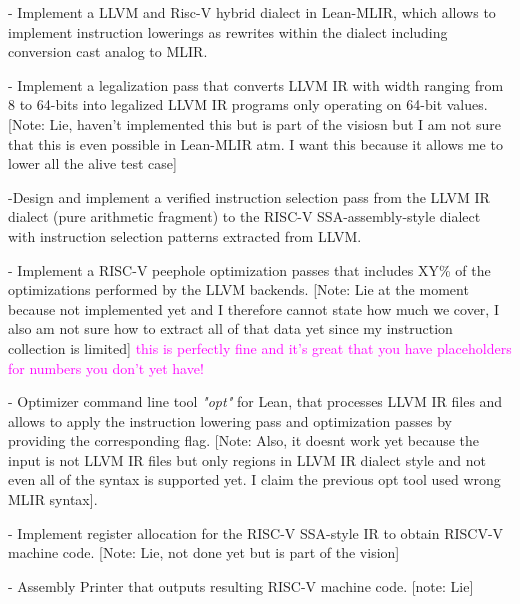 - Implement a LLVM and Risc-V hybrid dialect in Lean-MLIR, which allows to implement instruction lowerings as 
  rewrites within the dialect including conversion cast analog to MLIR.

- Implement a legalization pass that converts LLVM IR with width ranging from 8 to 64-bits into legalized 
  LLVM IR programs only operating on 64-bit values. 
[Note: Lie, haven't implemented this but is part of the visiosn but I am not sure that this is even possible in Lean-MLIR atm. 
I want this because it allows me to lower all the alive test case]

-Design and implement a verified instruction selection pass from the LLVM IR dialect (pure arithmetic fragment) 
  to the RISC-V SSA-assembly-style dialect with instruction selection patterns extracted from LLVM.

- Implement a RISC-V peephole optimization passes that includes XY\% of the optimizations performed by the LLVM backends.
[Note: Lie at the moment because not implemented yet and I therefore cannot state how much we cover, 
I also am not sure how to extract all of that data yet since my instruction collection is limited]
\textcolor{magenta}{this is perfectly fine and it's great that you have placeholders for numbers you don't yet have!}

- Optimizer command line tool \textit{"opt"} for Lean, that processes LLVM IR files and allows to apply the instruction 
lowering pass and optimization passes by providing the corresponding flag.
[Note: Also, it doesnt work yet because the input is not LLVM IR files but only regions in LLVM IR dialect style and 
not even all of the syntax is supported yet. I claim the previous opt tool used wrong MLIR syntax].

- Implement register allocation for the RISC-V SSA-style IR to obtain RISCV-V machine code.
[Note: Lie, not done yet but is part of the vision]

- Assembly Printer that outputs resulting RISC-V machine code.
[note: Lie]
